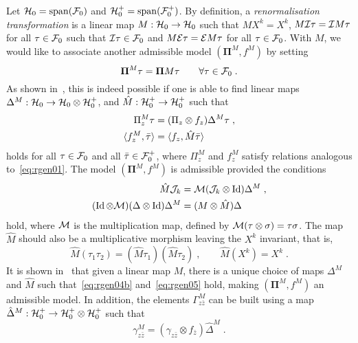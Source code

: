 \documentclass[reqno,11pt]{article}
\def\bPi{\mathbf{\Pi}}
\def\Mhat{\hat M}
\DeclareMathOperator{\vspan}{span}
\DeclareMathOperator{\Id}{Id}
\begin{document}
Let $\cH_0 = \vspan(\cF_0)$ and $\cH_0^+ = \vspan(\cF_0^+)$. By definition, a
\emph{renormalisation transformation} is a linear map $M:{\mathcal H}_0\to{\mathcal H}_0$ such
that $MX^k = X^k$, $M{\mathcal I}\tau = {\mathcal I} M\tau$ for all $\tau\in{\mathcal F}_0$ such that
${\mathcal I}\tau\in{\mathcal F}_0$ and  $M{\mathcal E}\tau = {\mathcal E} M\tau$ for all $\tau\in{\mathcal F}_0$. With $M$,
we would like to associate another admissible model $(\bPi^M,f^M)$ by
setting 
\begin{equation}
 \label{eq:rgen03}
 \bPi^M\tau = \bPi M \tau
 \qquad
 \forall \tau\in\cF_0\;.
\end{equation} 
As shown in~\cite[Section~8.3]{Hairer2014}, this is indeed possible if one
is able to find linear maps $\Delta^M:{\mathcal H}_0\to{\mathcal H}_0\otimes{\mathcal H}_0^+$, and $\hat
M:{\mathcal H}_0^+\to{\mathcal H}_0^+$ such that 
\begin{align}
\nonumber
\Pi^M_z \tau &= (\Pi_z\otimes f_z)\Delta^M \tau\;, \\
\label{eq:rgen04} 
\pscal{f^M_z}{\bar\tau} &= \pscal{f_z}{\hat M\bar\tau}
\end{align}
holds for all $\tau\in{\mathcal F}_0$ and all $\bar\tau\in{\mathcal F}_0^+$, where $\Pi^M_z$ and
$f^M_z$ satisfy relations analogous to~\eqref{eq:rgen01}. 
The model $(\bPi^M,f^M)$ is admissible provided the conditions 
\begin{align}
\nonumber
\hat M \cJ_k &= \cM(\cJ_k\otimes\Id)\Delta^M\;, \\
(\Id\otimes\cM)(\Delta\otimes\Id)\Delta^M &= (M\otimes\hat M)\Delta 
\label{eq:rgen04b} 
\end{align}
hold, where ${\mathcal M}$ is the multiplication map, defined by
${\mathcal M}(\tau\otimes\sigma)=\tau\sigma$.
%
The map $\hat M$
should also be a multiplicative morphism leaving the $X^k$ invariant, that is,  
\begin{equation}
 \label{eq:rgen05}
 \Mhat(\tau_1\tau_2) = (\Mhat\tau_1)(\Mhat\tau_2)\;, 
 \qquad
 \Mhat(X^k) = X^k\;.
\end{equation}
It is shown in~\cite[Prop.~8.36]{Hairer2014} that given a linear map $M$, there
is a unique choice of maps $\Delta^M$ and $\hat M$ such
that~\eqref{eq:rgen04b} and~\eqref{eq:rgen05} hold, making $(\bPi^M,f^M)$ an
admissible model. In addition, the elements $\Gamma^M_{z\bar z}$ can be
built using a map $\hat\Delta^M:{\mathcal H}_0^+\to{\mathcal H}_0^+\otimes{\mathcal H}_0^+$ such that  
\begin{equation}
\label{eq:rgen05b} 
\gamma^M_{z\bar z} = (\gamma_{z\bar z}\otimes f_{\bar z}) \hat\Delta^M\;.
\end{equation}
\end{document}
